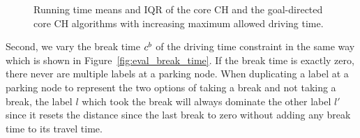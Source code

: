 \begin{figure}[hbtp]
	\centering
	\hfill
	\caption{Running time means and IQR of the core CH and the goal-directed core CH algorithms with increasing maximum allowed driving time.}
	\label{fig:eval_driving_time}
\end{figure}

Second, we vary the break time $c^b$ of the driving time constraint in the same way which is shown in Figure~\ref{fig:eval_break_time}. If the break time is exactly zero, there never are multiple labels at a parking node. When duplicating a label at a parking node to represent the two options of taking a break and not taking a break, the label $l$ which took the break will always dominate the other label $l'$ since it resets the distance since the last break to zero without adding any break time to its travel time.

